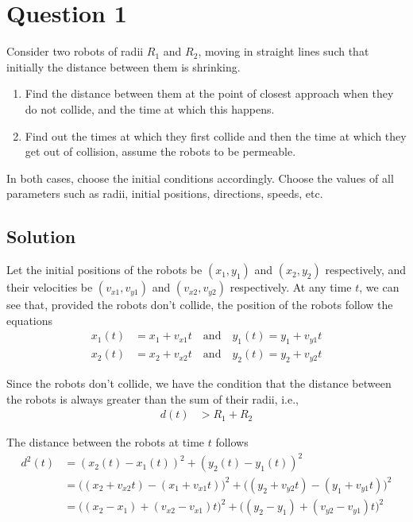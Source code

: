 \section*{Question 1}

Consider two robots of radii \( R_1 \) and \( R_2 \), moving in straight lines such that initially the distance between them is shrinking.
\begin{enumerate}[label= (\alph*), noitemsep, topsep=0pt]
    \item Find the distance between them at the point of closest approach when they do not collide, and the time at which this happens.
    \item Find out the times at which they first collide and then the time at which they get out of collision, assume the robots to be permeable.
\end{enumerate}
In both cases, choose the initial conditions accordingly. Choose the values of all parameters such as radii, initial positions, directions, speeds, etc.

\subsection*{Solution}

Let the initial positions of the robots be \( (x_1, y_1) \) and \( (x_2, y_2) \) respectively, and their velocities be \( (v_{x1}, v_{y1}) \) and \( (v_{x2}, v_{y2}) \) respectively.
At any time \( t \), we can see that, provided the robots don't collide, the position of the robots follow the equations
\begin{align*}
    x_1(t) &= x_1 + v_{x1}t \quad \text{and} \quad y_1(t) = y_1 + v_{y1}t \\
    x_2(t) &= x_2 + v_{x2}t \quad \text{and} \quad y_2(t) = y_2 + v_{y2}t
\end{align*}

Since the robots don't collide, we have the condition that the distance between the robots is always greater than the sum of their radii, i.e.,
\begin{align*}
    d(t) & > R_1 + R_2
\end{align*}

The distance between the robots at time \( t \) follows
\begin{align*}
    d^2(t)
    & =
    (x_2(t) - x_1(t))^2 + (y_2(t) - y_1(t))^2
    \\ & =
    \big((x_2 + v_{x2}t) - (x_1 + v_{x1}t)\big)^2 + \big((y_2 + v_{y2}t) - (y_1 + v_{y1}t)\big)^2
    \\ & =
    \big((x_2 - x_1) + (v_{x2} - v_{x1})t\big)^2 + \big((y_2 - y_1) + (v_{y2} - v_{y1})t\big)^2
\end{align*}

